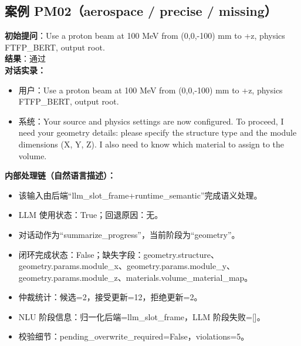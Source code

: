 \documentclass[11pt]{ctexart}
\begin{document}
\subsection{案例 PM02（aerospace / precise / missing）}
\textbf{初始提问}：Use a proton beam at 100 MeV from (0,0,-100) mm to +z, physics FTFP\_BERT, output root.\\
\textbf{结果}：通过\\
\textbf{对话实录：}
\begin{itemize}
\item 用户：Use a proton beam at 100 MeV from (0,0,-100) mm to +z, physics FTFP\_BERT, output root.
\item 系统：Your source and physics settings are now configured. To proceed, I need your geometry details: please specify the structure type and the module dimensions (X, Y, Z). I also need to know which material to assign to the volume.
\end{itemize}
\textbf{内部处理链（自然语言描述）：}
\begin{itemize}
\item 该输入由后端“llm\_slot\_frame+runtime\_semantic”完成语义处理。
\item LLM 使用状态：True；回退原因：无。
\item 对话动作为“summarize\_progress”，当前阶段为“geometry”。
\item 闭环完成状态：False；缺失字段：geometry.structure、geometry.params.module\_x、geometry.params.module\_y、geometry.params.module\_z、materials.volume\_material\_map。
\item 仲裁统计：候选=2，接受更新=12，拒绝更新=2。
\item NLU 阶段信息：归一化后端=llm\_slot\_frame，LLM 阶段失败=[]。
\item 校验细节：pending\_overwrite\_required=False，violations=5。
\end{itemize}
\end{document}
